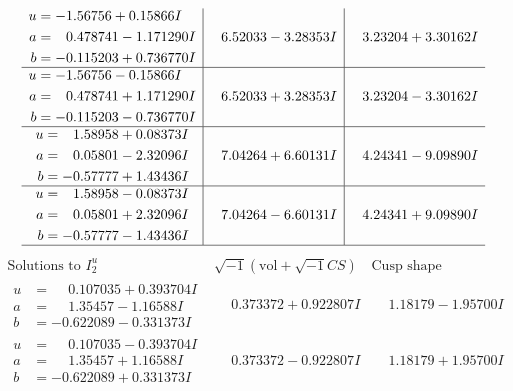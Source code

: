 \documentclass[1p]{elsarticle_modified}
\theoremstyle{definition}
\newcommand{\I}{\sqrt{-1}}
\begin{document}
$$\begin{array}{c|c|c}
\begin{aligned}
u &= -1.56756 + 0.15866 I \\
a &= \phantom{-}0.478741 - 1.171290 I \\
b &= -0.115203 + 0.736770 I\end{aligned}
 & \phantom{-}6.52033 - 3.28353 I & \phantom{-}3.23204 + 3.30162 I \\ \hline\begin{aligned}
u &= -1.56756 - 0.15866 I \\
a &= \phantom{-}0.478741 + 1.171290 I \\
b &= -0.115203 - 0.736770 I\end{aligned}
 & \phantom{-}6.52033 + 3.28353 I & \phantom{-}3.23204 - 3.30162 I \\ \hline\begin{aligned}
u &= \phantom{-}1.58958 + 0.08373 I \\
a &= \phantom{-}0.05801 - 2.32096 I \\
b &= -0.57777 + 1.43436 I\end{aligned}
 & \phantom{-}7.04264 + 6.60131 I & \phantom{-}4.24341 - 9.09890 I \\ \hline\begin{aligned}
u &= \phantom{-}1.58958 - 0.08373 I \\
a &= \phantom{-}0.05801 + 2.32096 I \\
b &= -0.57777 - 1.43436 I\end{aligned}
 & \phantom{-}7.04264 - 6.60131 I & \phantom{-}4.24341 + 9.09890 I\\
 \hline 
 \end{array}$$\newpage$$\begin{array}{c|c|c}  
\text{Solutions to }I^u_{2}& \I (\text{vol} + \sqrt{-1}CS) & \text{Cusp shape}\\
 \hline 
\begin{aligned}
u &= \phantom{-}0.107035 + 0.393704 I \\
a &= \phantom{-}1.35457 - 1.16588 I \\
b &= -0.622089 - 0.331373 I\end{aligned}
 & \phantom{-}0.373372 + 0.922807 I & \phantom{-}1.18179 - 1.95700 I \\ \hline\begin{aligned}
u &= \phantom{-}0.107035 - 0.393704 I \\
a &= \phantom{-}1.35457 + 1.16588 I \\
b &= -0.622089 + 0.331373 I\end{aligned}
 & \phantom{-}0.373372 - 0.922807 I & \phantom{-}1.18179 + 1.95700 I \\ \hline\begin{aligned}

\end{aligned}
\end{array}$$
\end{document}
